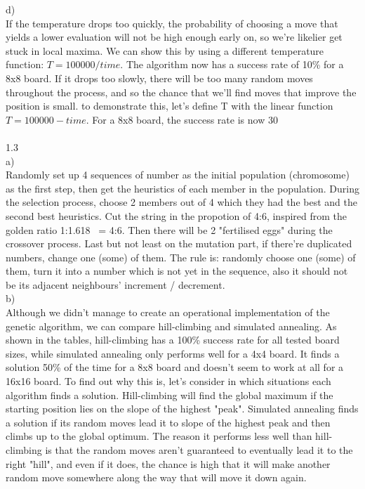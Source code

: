 \documentclass{article}
\begin{document}
d)
\\
If the temperature drops too quickly, the probability of choosing a move that yields a lower evaluation will not be high enough early on, so we're likelier get stuck in local maxima. We can show this by using a different temperature function: $ T = 100000/time $. The algorithm now has a success rate of 10\% for a 8x8 board. If it drops too slowly, there will be too many random moves throughout the process, and so the chance that we'll find moves that improve the position is small. to demonstrate this, let's define T with the linear function $T = 100000 - time$. For a 8x8 board, the success rate is now 30%
\\
\\
1.3
\\
a)
\\
Randomly set up 4 sequences of number as the initial population (chromosome) as the first step, then get the heuristics of each member in the population. During the selection process, choose 2 members out of 4 which they had the best and the second best heuristics. Cut the string in the propotion of 4:6, inspired from the golden ratio 1:1.618 ~= 4:6. Then there will be 2 "fertilised eggs" during the crossover process. Last but not least on the mutation part, if there're duplicated numbers, change one (some) of them. The rule is: randomly choose one (some) of them, turn it into a number which is not yet in the sequence, also it should not be its adjacent neighbours' increment / decrement.
\\
b)
\\
Although we didn't manage to create an operational implementation of the genetic algorithm, we can compare hill-climbing and simulated annealing. As shown in the tables, hill-climbing has a 100\% success rate for all tested board sizes, while simulated annealing only performs well for a 4x4 board. It finds a solution 50\% of the time for a 8x8 board and doesn't seem to work at all for a 16x16 board. To find out why this is, let's consider in which situations each algorithm finds a solution. Hill-climbing will find the global maximum if the starting position lies on the slope of the highest "peak". Simulated annealing finds a solution if its random moves lead it to slope of the highest peak and then climbs up to the global optimum. The reason it performs less well than hill-climbing is that the random moves aren't guaranteed to eventually lead it to the right "hill", and even if it does, the chance is high that it will make another random move somewhere along the way that will move it down again.
\\
\end{document}
